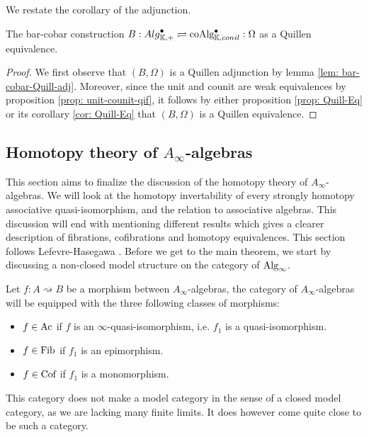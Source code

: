 \documentclass[../thesis.tex]{subfiles}
\begin{document}
        We restate the corollary of the adjunction.
        \begin{corollary}\label{cor: cobar-bar-quill-eq}
            The bar-cobar construction $B: {Alg}^\bullet_{\mathbb{K},+} \rightleftharpoons \tt{coAlg}^\bullet_{\mathbb{K},conil} : \Omega$ as a Quillen equivalence.
        \end{corollary}

        \begin{proof}
            We first observe that $(B, \Omega)$ is a Quillen adjunction by lemma \ref{lem: bar-cobar-Quill-adj}. Moreover, since the unit and counit are weak equivalences by proposition \ref{prop: unit-counit-qif}, it follows by either proposition \ref{prop: Quill-Eq} or its corollary \ref{cor: Quill-Eq} that $(B, \Omega)$ is a Quillen equivalence.
        \end{proof}

    \subsection{Homotopy theory of $A_{\infty}$-algebras}

        This section aims to finalize the discussion of the homotopy theory of $A_{\infty}$-algebras. We will look at the homotopy invertability of every strongly homotopy associative quasi-isomorphism, and the relation to associative algebras. This discussion will end with mentioning different results which gives a clearer description of fibrations, cofibrations and homotopy equivalences. This section follows Lefevre-Hasegawa \cite{LefevreHasegawa03}. Before we get to the main theorem, we start by discussing a non-closed model structure on the category of $\tt{Alg}_\infty$.

        Let $f: A \rightsquigarrow B$ be a morphism between $A_\infty$-algebras, the category of $A_\infty$-algebras will be equipped with the three following classes of morphisms:
        \begin{itemize}
            \item $f\in \tt{Ac}$ if $f$ is an $\infty$-quasi-isomorphism, i.e. $f_1$ is a quasi-isomorphism.
            \item $f\in \tt{Fib}$ if $f_1$ is an epimorphism.
            \item $f\in \tt{Cof}$ if $f_1$ is a monomorphism.
        \end{itemize}

        This category does not make a model category in the sense of a closed model category, as we are lacking many finite limits. It does however come quite close to be such a category.
\end{document}
